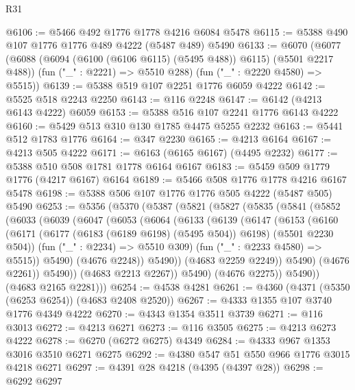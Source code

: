\begin{lexlean}{R31}
\begin{coremodule}
@6106 := @5466 @492 @1776 @1778 @4216 @6084 @5478
@6115 := @5388 @490 @107 @1776 @1776 @489 @4222 (@5487 @489) @5490
@6133 := @6070
    (@6077
      (@6088 (@6094 (@6100 (@6106 @6115) (@5495 @488)) @6115) (@5501 @2217 @488))
      (fun ("_" : @2221) => @5510 @288)
      (fun ("_" : @2220 @4580) => @5515))
@6139 := @5388 @519 @107 @2251 @1776 @6059 @4222
@6142 := @5525 @518 @2243 @2250
@6143 := @116 @2248
@6147 := @6142 (@4213 @6143 @4222) @6059
@6153 := @5388 @516 @107 @2241 @1776 @6143 @4222
@6160 := @5429 @513 @310 @130 @1785 @4475 @5255 @2232
@6163 := @5441 @512 @1783 @1776
@6164 := @347 @2230
@6165 := @4213 @6164
@6167 := @4213 @505 @4222
@6171 := @6163 (@6165 @6167) (@4495 @2232)
@6177 := @5388 @510 @508 @1781 @1778 @6164 @6167
@6183 := @5459 @509 @1779 @1776 (@4217 @6167) @6164
@6189 := @5466 @508 @1776 @1778 @4216 @6167 @5478
@6198 := @5388 @506 @107 @1776 @1776 @505 @4222 (@5487 @505) @5490
@6253 := @5356
    (@5370
      (@5387
        (@5821
          (@5827
            (@5835
              (@5841
                (@5852
                  (@6033
                    (@6039
                      (@6047
                        (@6053
                          (@6064
                            (@6133
                              (@6139
                                (@6147
                                  (@6153
                                    (@6160
                                      (@6171
                                        (@6177 (@6183 (@6189 @6198) (@5495 @504)) @6198)
                                        (@5501 @2230 @504))
                                      (fun ("_" : @2234) => @5510 @309)
                                      (fun ("_" : @2233 @4580) => @5515))
                                    @5490)
                                  (@4676 @2248))
                                @5490))
                            (@4683 @2259 @2249))
                          @5490)
                        (@4676 @2261))
                      @5490))
                  (@4683 @2213 @2267))
                @5490)
              (@4676 @2275))
            @5490))
        (@4683 @2165 @2281)))
@6254 := @4538 @4281
@6261 := @4360 (@4371 (@5350 (@6253 @6254)) (@4683 @2408 @2520))
@6267 := @4333 @1355 @107 @3740 @1776 @4349 @4222
@6270 := @4343 @1354 @3511 @3739
@6271 := @116 @3013
@6272 := @4213 @6271
@6273 := @116 @3505
@6275 := @4213 @6273 @4222
@6278 := @6270 (@6272 @6275) @4349
@6284 := @4333 @967 @1353 @3016 @3510 @6271 @6275
@6292 := @4380 @547 @51 @550 @966 @1776 @3015 @4218 @6271
@6297 := @4391 @28 @4218 (@4395 (@4397 @28))
@6298 := @6292 @6297

\end{coremodule}
\end{lexlean}

